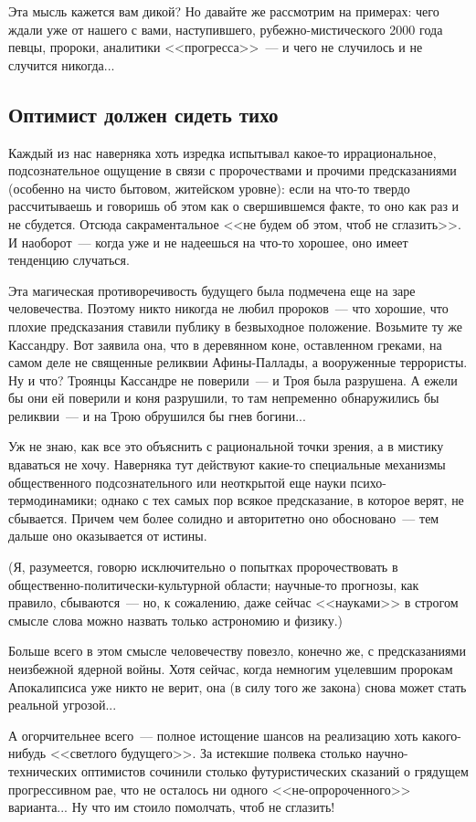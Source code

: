 \documentclass{scrbook}
\newcommand{\flqq}{<<}
\newcommand{\frqq}{>>}
\newcommand{\mdash}{~--- }
\newcommand{\essaysection}[1]{\subsection*{#1}\nopagebreak}
\begin{document}
Эта мысль кажется вам дикой? Но давайте же рассмотрим на примерах: чего ждали уже от нашего с вами, наступившего, рубежно-мистического 2000 года певцы, пророки, аналитики {\flqq}прогресса{\frqq}{\mdash}и чего не случилось и не случится никогда...

\essaysection{Оптимист должен сидеть тихо}

Каждый из нас наверняка хоть изредка испытывал какое-то иррациональное, подсознательное ощущение в связи с пророчествами и прочими предсказаниями (особенно на чисто бытовом, житейском уровне): если на что-то твердо рассчитываешь и говоришь об этом как о свершившемся факте, то оно как раз и не сбудется. Отсюда сакраментальное {\flqq}не будем об этом, чтоб не сглазить{\frqq}. И наоборот{\mdash}когда уже и не надеешься на что-то хорошее, оно имеет тенденцию случаться.

Эта магическая противоречивость будущего была подмечена еще на заре человечества. Поэтому никто никогда не любил пророков{\mdash}что хорошие, что плохие предсказания ставили публику в безвыходное положение. Возьмите ту же Кассандру. Вот заявила она, что в деревянном коне, оставленном греками, на самом деле не священные реликвии Афины-Паллады, а вооруженные террористы. Ну и что? Троянцы Кассандре не поверили{\mdash}и Троя была разрушена. А ежели бы они ей поверили и коня разрушили, то там непременно обнаружились бы реликвии{\mdash}и на Трою обрушился бы гнев богини...

Уж не знаю, как все это объяснить с рациональной точки зрения, а в мистику вдаваться не хочу. Наверняка тут действуют какие-то специальные механизмы общественного подсознательного или неоткрытой еще науки психо-термодинамики; однако с тех самых пор всякое предсказание, в которое верят, не сбывается. Причем чем более солидно и авторитетно оно обосновано{\mdash}тем дальше оно оказывается от истины.

(Я, разумеется, говорю исключительно о попытках пророчествовать в общественно-политически-культурной области; научные-то прогнозы, как правило, сбываются{\mdash}но, к сожалению, даже сейчас {\flqq}науками{\frqq} в строгом смысле слова можно назвать только астрономию и физику.)

Больше всего в этом смысле человечеству повезло, конечно же, с предсказаниями неизбежной ядерной войны. Хотя сейчас, когда немногим уцелевшим пророкам Апокалипсиса уже никто не верит, она (в силу того же закона) снова может стать реальной угрозой...

А огорчительнее всего{\mdash}полное истощение шансов на реализацию хоть какого-нибудь {\flqq}светлого будущего{\frqq}. За истекшие полвека столько научно-технических оптимистов сочинили столько футуристических сказаний о грядущем прогрессивном рае, что не осталось ни одного {\flqq}не-опророченного{\frqq} варианта... Ну что им стоило помолчать, чтоб не сглазить!
\end{document}
